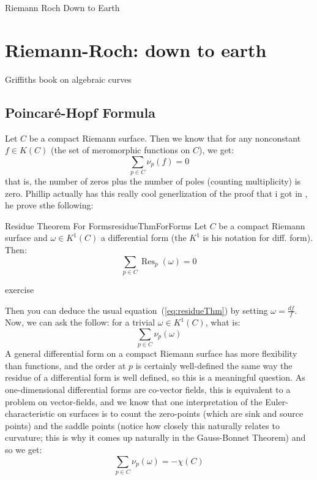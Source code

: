 \documentclass{book}
\def\title{Riemann Roch Down to Earth}
\newcommand{\Res}{{\operatorname{Res}}}
\begin{document}
\title
\chapter{Riemann-Roch: down to earth}

Griffiths book on algebraic curves

\section{Poincar\'e-Hopf Formula}\label{sec:poincareHopfFormula}

Let $C$ be a compact Riemann surface. Then we know that for any nonconstant $f \in K(C)$ (the set of
meromorphic functions on $C$), we get:
\begin{equation}\label{eq:residueThm}
  \sum_{p \in C} \nu_p(f) = 0
\end{equation}
that is, the number of zeros plus the number of poles (counting multiplicity) is zero. Phillip actually has
this really cool generlization of the proof that i got in \cite{NateComplexAnalysis}, he prove sthe following:

\begin{thm}{Residue Theorem For Forms}{residueThmForForms}
  Let $C$ be a compact Riemann surface and $\omega \in K^1(C)$ a differential form (the $K^1$ is his notation
  for diff. form). Then:
  \[
    \sum_{p \in C} \Res_p(\omega) = 0
  \]
\end{thm}

\begin{Proof}
  exercise
\end{Proof}

Then you can deduce the usual equation~(\ref{eq:residueThm}) by setting $\omega=  \frac{df}{f}$.  Now, we can
ask the follow: for a trivial $\omega \in K^1(C)$, what is:
\[
  \sum_{p \in C} \nu_p(\omega)
\]
A general differential form on a compact Riemann surface has more flexibility than functions, and the
order at $p$ is certainly well-defined the same way the residue of a differential form is well defined, so
this is a meaningful question. As one-dimensional differential forms are co-vector fields, this is equivalent
to a problem on vector-fields, and we know that one interpretation of the Euler-characteristic on surfaces is
to count the zero-points (which are sink and source points) and the saddle points (notice how closely this
naturally relates to curvature; this is why it comes up naturally in the Gauss-Bonnet Theorem) and  so we get:
\[
  \sum_{p \in C} \nu_p(\omega) = -\chi(C)
\]
\end{document}
